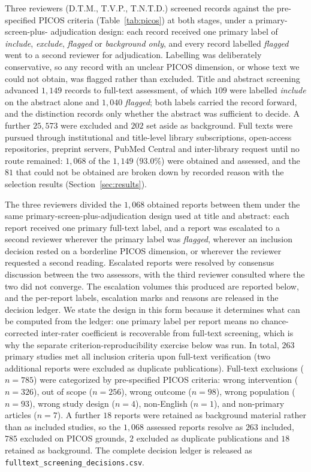 \documentclass[review,authoryear]{elsarticle}
\begin{document}
Three reviewers (D.T.M., T.V.P., T.N.T.D.) screened records against the pre-specified
PICOS criteria (Table~\ref{tab:picos}) at both stages, under a primary-screen-plus-
adjudication design: each record received one primary label of \emph{include},
\emph{exclude}, \emph{flagged} or \emph{background only}, and every record labelled
\emph{flagged} went to a second reviewer for adjudication. Labelling was deliberately
conservative, so any record with an unclear PICOS dimension, or whose text we could not
obtain, was flagged rather than excluded. Title
and abstract screening advanced $1{,}149$ records to full-text assessment, of which
$109$ were labelled \emph{include} on the abstract alone and $1{,}040$ \emph{flagged};
both labels carried the record forward, and the distinction records only whether the
abstract was sufficient to decide. A further $25{,}573$ were excluded and $202$ set
aside as background. Full texts were pursued through institutional and title-level
library subscriptions, open-access repositories, preprint servers, PubMed Central and
inter-library request until no route remained: $1{,}068$ of the $1{,}149$ ($93.0\%$)
were obtained and assessed, and the $81$ that could not be obtained are broken down by
recorded reason with the selection results (Section~\ref{sec:results}).

The three reviewers divided the $1{,}068$ obtained reports between them under the same
primary-screen-plus-adjudication design used at title and abstract: each report received
one primary full-text label, and a report was escalated to a second reviewer wherever the
primary label was \emph{flagged}, wherever an inclusion decision rested on a borderline
PICOS dimension, or wherever the reviewer requested a second reading. Escalated reports
were resolved by consensus discussion between the two assessors, with the third reviewer
consulted where the two did not converge. The escalation volumes this produced are
reported below, and the per-report labels, escalation marks and reasons are released in
the decision ledger. We state the design in this form because it determines what can be
computed from the ledger: one primary label per report means no chance-corrected
inter-rater coefficient is recoverable from full-text screening, which is why the separate
criterion-reproducibility exercise below was run. In total, $263$ primary studies met
all inclusion criteria upon full-text verification (two additional reports were excluded as duplicate publications).
Full-text exclusions ($n=785$) were categorized by pre-specified PICOS criteria: wrong
intervention ($n=326$), out of scope ($n=256$), wrong outcome ($n=98$), wrong population
($n=93$), wrong study design ($n=4$), non-English ($n=1$), and non-primary articles
($n=7$). A further $18$ reports were retained as background material rather than as
included studies, so the $1{,}068$ assessed reports resolve as $263$ included, $785$
excluded on PICOS grounds, $2$ excluded as duplicate publications and $18$ retained as
background. The complete decision ledger is released as
\texttt{fulltext\_screening\_decisions.csv}.
\end{document}
